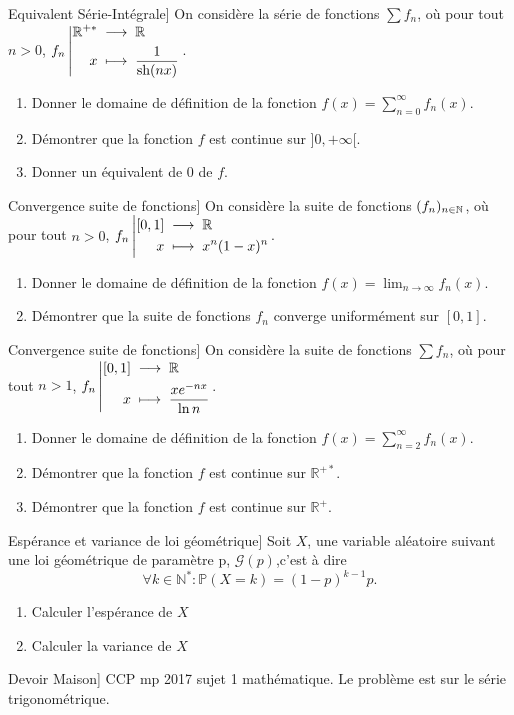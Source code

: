 \documentclass{book}
\begin{document}
\begin{Exercice}Equivalent Série-Intégrale]
On considère la série de fonctions $\sum f_n$, où pour tout $n>0$, ${f_n}\left|\begin{aligned}{\mathbb{R}^{+*}}&\;\longrightarrow\;{\mathbb{R}}\\{x}&\;\longmapsto\;{\frac{1}{\text{sh} (nx)}}\end{aligned}\right.$. 
\begin{enumerate}
\item Donner le domaine de définition de la fonction $f(x)=\sum_{n=0}^{\infty} f_n(x)$.
\item Démontrer que la fonction $f$ est continue sur $]0,+\infty[$.
\item Donner un équivalent de $0$ de $f$. 
\end{enumerate}

\end{Exercice}

\begin{Exercice}Convergence suite de fonctions]
On considère la suite de fonctions $(f_n)_{n\in\mathbb{N}}$, où pour tout $n>0$, ${f_n}\left|\begin{aligned}{[0,1]}&\;\longrightarrow\;{\mathbb{R}}\\{x}&\;\longmapsto\;{x^n(1-x)^n}\end{aligned}\right.$.  
\begin{enumerate}
\item Donner le domaine de définition de la fonction $f(x)=\lim_{n\to\infty} f_n(x)$.
\item Démontrer que la suite de fonctions $f_n$ converge uniformément sur $[0,1]$.
\end{enumerate}
\end{Exercice}


\begin{Exercice}Convergence suite de fonctions]
On considère la suite de fonctions $\sum f_n$, où pour tout $n>1$, ${f_n}\left|\begin{aligned}{[0,1]}&\;\longrightarrow\;{\mathbb{R}}\\{x}&\;\longmapsto\;{\frac{xe^{-nx}}{\ln n}}\end{aligned}\right.$.  
\begin{enumerate}
\item Donner le domaine de définition de la fonction $f(x)=\sum_{n=2}^\infty f_n(x)$.
\item Démontrer que la fonction $f$ est continue sur $\mathbb{R}^{+*}$.
\item Démontrer que la fonction $f$ est continue sur $\mathbb{R}^{+}$.
\end{enumerate}
\end{Exercice}

\begin{Exercice}Espérance et variance de loi géométrique]
Soit $X$, une variable aléatoire suivant une loi géométrique de paramètre p, $\mathcal{G}(p)$,c'est à dire  $$\forall k \in \mathbb{N}^*:\mathbb{P}(X=k)=(1-p)^{k-1}p.$$
\begin{enumerate}
\item Calculer l'espérance de $X$
\item Calculer la variance de $X$
\end{enumerate}
\end{Exercice}

\begin{Exercice}Devoir Maison]
CCP mp 2017 sujet 1 mathématique. Le problème est sur le série trigonométrique. 
\end{Exercice}
\end{document}
